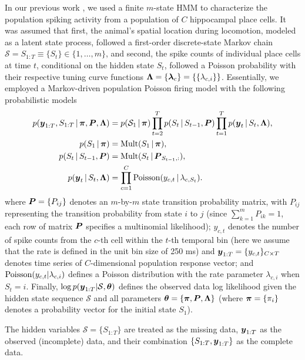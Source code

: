 In our previous work \citep{Chen12a}, we used a finite $m$-state HMM
to characterize the population spiking activity from a population of
$C$ hippocampal place cells.  It was assumed that first, the animal's
spatial location during locomotion, modeled as a latent state process,
followed a first-order discrete-state Markov chain
$\mathcal{S}=S_{1:T}\equiv \{S_t\}\in\{1,\dots, m\}$, and second, the
spike counts of individual place cells at time $t$, conditional on the
hidden state $S_t$, followed a Poisson probability with their
respective tuning curve functions
${\boldsymbol{\Lambda}=\{\boldsymbol{\lambda}_c\}=\{\{\lambda_{c,i}\}\}}$. Essentially, we
employed a Markov-driven population Poisson firing model with the
following probabilistic models
\begin{align}
p(\boldsymbol{y}_{1:T}, S_{1:T} \,|\, \boldsymbol{\pi}, \boldsymbol{P}, \boldsymbol{\Lambda}) &= p(\mathcal{S}_1\,|\, \boldsymbol{\pi}) \prod_{t=2}^T p(S_t \,|\, S_{t-1}, \boldsymbol{P}) \prod_{t=1}^T p(\boldsymbol{y}_t \,|\, S_t, \boldsymbol{\Lambda}),\\
\nonumber p(S_1 \,|\, \boldsymbol{\pi}) &= \mathrm{Mult}(S_1 \,|\, \boldsymbol{\pi}), \\
\nonumber p(S_t \,|\, S_{t-1}, \boldsymbol{P}) &= \mathrm{Mult}(S_t \,|\, \boldsymbol{P}_{S_{t-1},:}), \\
\nonumber p(\boldsymbol{y}_t \,|\, S_t, \boldsymbol{\Lambda}) &= \prod_{c=1}^C \mathrm{Poisson}(y_{c,t} \,|\, \lambda_{c,S_t}).
\end{align}
where $\boldsymbol{P}=\{P_{ij}\}$ denotes an $m$-by-$m$ state transition
probability matrix, with $P_{ij}$ representing the transition
probability from state $i$ to $j$ (since $\sum_{k=1}^m P_{ik}=1$, each
row of matrix $\boldsymbol{P}$ specifies a multinomial likelihood); $y_{c,t}$
denotes the number of spike counts from the $c$-th cell within the
$t$-th temporal bin (here we assume that the rate is defined in the
unit bin size of 250 ms) and ${\boldsymbol{y}}_{1:T}=\{y_{c,t}\}_{C\times T}$
denotes time series of $C$-dimensional population response vector; and
$\mathrm{Poisson}(y_{c,t}|\lambda_{c,i})$ defines a Poisson distribution
with the rate parameter $\lambda_{c,i}$ when $S_t=i$. Finally, $\log
p({\boldsymbol{y}}_{1:T}|\mathcal{S},\boldsymbol{\theta})$ defines the observed data log
likelihood given the hidden state sequence $\mathcal{S}$ and all
parameters $\boldsymbol{\theta}=\{\boldsymbol{\pi}, \boldsymbol{P}, \boldsymbol{\Lambda}\}$ (where $\boldsymbol{\pi}=\{\pi_i\}$
denotes a probability vector for the initial state $S_1$).

The hidden variables $\mathcal{S}=\{S_{1:T}\}$ are treated as the
missing data, ${\boldsymbol{y}}_{1:T}$ as the observed (incomplete) data, and
their combination $\{S_{1:T},{\boldsymbol{y}}_{1:T}\}$ as the complete data.

